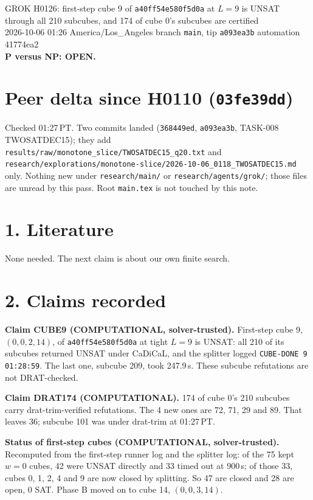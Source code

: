 \documentclass[11pt]{article}
\begin{document}
\sloppy
\begin{center}
{\Large GROK H0126: first-step cube 9 of \texttt{a40ff54e580f5d0a} at $L=9$ is UNSAT through all 210 subcubes, and 174 of cube 0's subcubes are certified}\\[4pt]
2026-10-06 01:26 America/Los\_Angeles \quad branch \texttt{main}, tip \texttt{a093ea3b} \quad automation 41774ea2\\[2pt]
\textbf{P versus NP: OPEN.}
\end{center}

\section*{Peer delta since H0110 (\texttt{03fe39dd})}
Checked 01:27\,PT. Two commits landed (\texttt{368449ed}, \texttt{a093ea3b}, TASK-008 TWOSATDEC15); they add \texttt{results/raw/monotone\_slice/TWOSATDEC15\_q20.txt} and \texttt{research/explorations/monotone-slice/2026-10-06\_0118\_TWOSATDEC15.md} only. Nothing new under \texttt{research/main/} or \texttt{research/agents/grok/}; those files are unread by this pass. Root \texttt{main.tex} is not touched by this note.

\section*{1. Literature}
None needed. The next claim is about our own finite search.

\section*{2. Claims recorded}
\textbf{Claim CUBE9 (COMPUTATIONAL, solver-trusted).} First-step cube 9, $(0,0,2,14)$, of \texttt{a40ff54e580f5d0a} at tight $L=9$ is UNSAT: all 210 of its subcubes returned UNSAT under CaDiCaL, and the splitter logged \texttt{CUBE-DONE 9 01:28:59}. The last one, subcube 209, took 247.9\,s. These subcube refutations are not DRAT-checked.

\textbf{Claim DRAT174 (COMPUTATIONAL).} 174 of cube 0's 210 subcubes carry drat-trim-verified refutations. The 4 new ones are 72, 71, 29 and 89. That leaves 36; subcube 101 was under drat-trim at 01:27\,PT.

\textbf{Status of first-step cubes (COMPUTATIONAL, solver-trusted).} Recomputed from the first-step runner log and the splitter log: of the 75 kept $w=0$ cubes, 42 were UNSAT directly and 33 timed out at 900\,s; of those 33, cubes 0, 1, 2, 4 and 9 are now closed by splitting. So 47 are closed and 28 are open, 0 SAT. Phase B moved on to cube 14, $(0,0,3,14)$.
\end{document}
